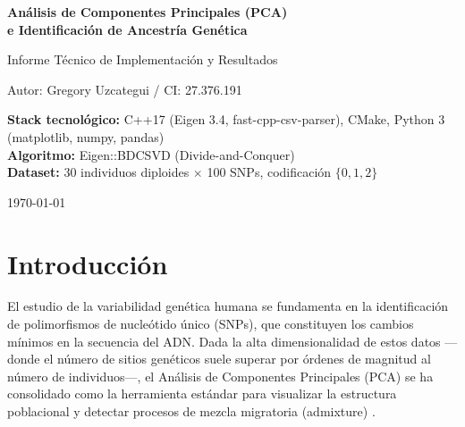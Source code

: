 \documentclass[12pt,a4paper]{article}
\theoremstyle{definition}
\newcommand{\R}{\mathbb{R}}
\begin{document}
\begin{titlepage}
    \centering
    \vspace*{2cm}
    {\Huge\bfseries An\'{a}lisis de Componentes Principales (PCA)\\[0.3cm] e Identificaci\'{o}n de Ancestr\'{i}a Gen\'{e}tica\par}
    \vspace{1.5cm}
    {\Large Informe T\'{e}cnico de Implementaci\'{o}n y Resultados\par}
    \vspace{2cm}
    {\Large Autor: Gregory Uzcategui / CI: 27.376.191 \par}
    \vspace{2cm}
    {\large
    \textbf{Stack tecnol\'{o}gico:} C++17 (Eigen 3.4, fast-cpp-csv-parser), CMake, Python 3 (matplotlib, numpy, pandas)\\[0.5cm]
    \textbf{Algoritmo:} Eigen::BDCSVD (Divide-and-Conquer)\\[0.5cm]
    \textbf{Dataset:} 30 individuos diploides $\times$ 100 SNPs, codificaci\'{o}n $\{0,1,2\}$
    \par}
    \vfill
    {\large \today\par}
\end{titlepage}

\begin{abstract}
\noindent
Este informe documenta la implementaci\'{o}n de un pipeline computacional para el an\'{a}lisis de estructura poblacional mediante Componentes Principales (PCA) aplicado a datos gen\'{e}ticos de SNPs. Se proces\'{o} una matriz de genotipos $G \in \R^{100 \times 30}$ (100 SNPs, 30 individuos diploides), codificada en $\{0,1,2\}$. El flujo incluye: estimaci\'{o}n de frecuencias al\'{e}licas, filtrado de SNPs constantes, normalizaci\'{o}n de Patterson (Wright-Fisher), descomposici\'{o}n en valores singulares (SVD) y proyecci\'{o}n al espacio de componentes principales $PC = U\Sigma$. 
\end{abstract}

\tableofcontents
\newpage

\section{Introducci\'{o}n}\label{sec:intro}

El estudio de la variabilidad gen\'{e}tica humana se fundamenta en la identificaci\'{o}n de polimorfismos de nucle\'{o}tido \'unico (SNPs), que constituyen los cambios m\'{i}nimos en la secuencia del ADN. Dada la alta dimensionalidad de estos datos ---donde el n\'{u}mero de sitios gen\'{e}ticos suele superar por \'ordenes de magnitud al n\'{u}mero de individuos---, el An\'{a}lisis de Componentes Principales (PCA) se ha consolidado como la herramienta est\'{a}ndar para visualizar la estructura poblacional y detectar procesos de mezcla migratoria (admixture) \cite{patterson2006}.
\end{document}

